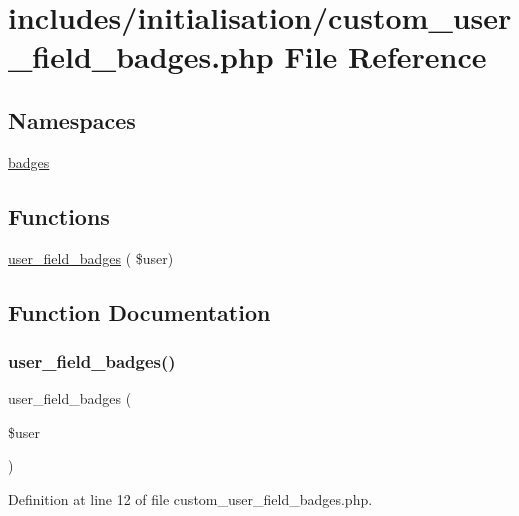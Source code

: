 \hypertarget{custom__user__field__badges_8php}{}\section{includes/initialisation/custom\+\_\+user\+\_\+field\+\_\+badges.php File Reference}
\label{custom__user__field__badges_8php}
\subsection*{Namespaces}
\begin{DoxyCompactItemize}
\item 
 \hyperlink{namespacebadges}{badges}
\end{DoxyCompactItemize}
\subsection*{Functions}
\begin{DoxyCompactItemize}
\item 
\hyperlink{custom__user__field__badges_8php_a12cdd6e40ea66eef60b676a7f4e5640c}{user\+\_\+field\+\_\+badges} ( \$user)
\end{DoxyCompactItemize}


\subsection{Function Documentation}
\mbox{\label{custom__user__field__badges_8php_a12cdd6e40ea66eef60b676a7f4e5640c}} 
\subsubsection{\texorpdfstring{user\+\_\+field\+\_\+badges()}{user\_field\_badges()}}
{\footnotesize\ttfamily user\+\_\+field\+\_\+badges (\begin{DoxyParamCaption}\item[{}]{\$user }\end{DoxyParamCaption})}



Definition at line 12 of file custom\+\_\+user\+\_\+field\+\_\+badges.\+php.

